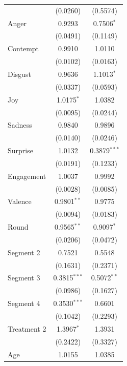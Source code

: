\begin{table}[!htbp]
\begin{minipage}{\textwidth}
\begin{tabular*}{\textwidth}{@{\extracolsep{\fill}} l c c @{\hspace{4em}}}
                             & (0.0260) & (0.5574) \\
   Anger                     & 0.9293 & 0.7506$^{*}$ \\
                             & (0.0491) & (0.1149) \\
   Contempt                  & 0.9910 & 1.0110 \\
                             & (0.0102) & (0.0163) \\
   Disgust                   & 0.9636 & 1.1013$^{*}$ \\
                             & (0.0337) & (0.0593) \\
   Joy                       & 1.0175$^{*}$ & 1.0382 \\
                             & (0.0095) & (0.0244) \\
   Sadness                   & 0.9840 & 0.9896 \\
                             & (0.0140) & (0.0246) \\
   Surprise                  & 1.0132 & 0.3879$^{***}$ \\
                             & (0.0191) & (0.1233) \\
   Engagement                & 1.0037 & 0.9992 \\
                             & (0.0028) & (0.0085) \\
   Valence                   & 0.9801$^{**}$ & 0.9775 \\
                             & (0.0094) & (0.0183) \\
   Round                     & 0.9565$^{**}$ & 0.9097$^{*}$ \\
                             & (0.0206) & (0.0472) \\
   Segment 2                 & 0.7521 & 0.5548 \\
                             & (0.1631) & (0.2371) \\
   Segment 3                 & 0.3815$^{***}$ & 0.5072$^{**}$ \\
                             & (0.0986) & (0.1627) \\
   Segment 4                 & 0.3530$^{***}$ & 0.6601 \\
                             & (0.1042) & (0.2293) \\
   Treatment 2               & 1.3967$^{*}$ & 1.3931 \\
                             & (0.2422) & (0.3327) \\
   Age                       & 1.0155 & 1.0385 \\

\end{tabular*}
\end{minipage}
\end{table}

